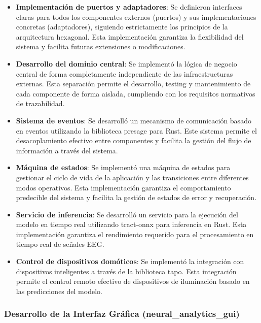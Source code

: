 \begin{itemize}
    \item \textbf{Implementación de puertos y adaptadores}: Se definieron interfaces claras para todos los componentes externos (puertos) y sus implementaciones concretas (adaptadores), siguiendo estrictamente los principios de la arquitectura hexagonal. Esta implementación garantiza la flexibilidad del sistema y facilita futuras extensiones o modificaciones.
    
    \item \textbf{Desarrollo del dominio central}: Se implementó la lógica de negocio central de forma completamente independiente de las infraestructuras externas. Esta separación permite el desarrollo, testing y mantenimiento de cada componente de forma aislada, cumpliendo con los requisitos normativos de trazabilidad.
    
    \item \textbf{Sistema de eventos}: Se desarrolló un mecanismo de comunicación basado en eventos utilizando la biblioteca presage para Rust. Este sistema permite el desacoplamiento efectivo entre componentes y facilita la gestión del flujo de información a través del sistema.
    
    \item \textbf{Máquina de estados}: Se implementó una máquina de estados para gestionar el ciclo de vida de la aplicación y las transiciones entre diferentes modos operativos. Esta implementación garantiza el comportamiento predecible del sistema y facilita la gestión de estados de error y recuperación.
    
    \item \textbf{Servicio de inferencia}: Se desarrolló un servicio para la ejecución del modelo en tiempo real utilizando tract-onnx para inferencia en Rust. Esta implementación garantiza el rendimiento requerido para el procesamiento en tiempo real de señales EEG.
    
    \item \textbf{Control de dispositivos domóticos}: Se implementó la integración con dispositivos inteligentes a través de la biblioteca tapo. Esta integración permite el control remoto efectivo de dispositivos de iluminación basado en las predicciones del modelo.
\end{itemize}

\newpage
\subsubsection{Desarrollo de la Interfaz Gráfica (neural\_analytics\_gui)}

